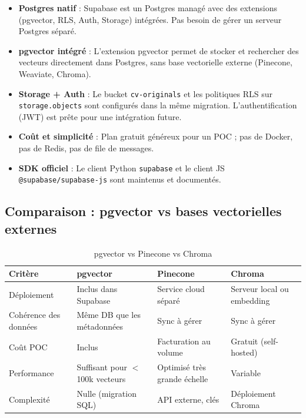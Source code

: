 \documentclass[11pt,a4paper]{report}
\begin{document}
\begin{itemize}[leftmargin=*]
  \item \textbf{Postgres natif} : Supabase est un Postgres managé avec des extensions (pgvector, RLS, Auth, Storage) intégrées. Pas besoin de gérer un serveur Postgres séparé.
  \item \textbf{pgvector intégré} : L'extension pgvector permet de stocker et rechercher des vecteurs directement dans Postgres, sans base vectorielle externe (Pinecone, Weaviate, Chroma).
  \item \textbf{Storage + Auth} : Le bucket \texttt{cv-originals} et les politiques RLS sur \texttt{storage.objects} sont configurés dans la même migration. L'authentification (JWT) est prête pour une intégration future.
  \item \textbf{Coût et simplicité} : Plan gratuit généreux pour un POC ; pas de Docker, pas de Redis, pas de file de messages.
  \item \textbf{SDK officiel} : Le client Python \texttt{supabase} et le client JS \texttt{@supabase/supabase-js} sont maintenus et documentés.
\end{itemize}

\subsection{Comparaison : pgvector vs bases vectorielles externes}

\begin{table}[H]
  \centering
  \caption{pgvector vs Pinecone vs Chroma}
  \small
  \begin{tabular}{@{}lp{2.5cm}p{2.5cm}p{2.5cm}@{}}
    \toprule
    \textbf{Critère} & \textbf{pgvector} & \textbf{Pinecone} & \textbf{Chroma} \\
    \midrule
    Déploiement & Inclus dans Supabase & Service cloud séparé & Serveur local ou embedding \\
    Cohérence des données & Même DB que les métadonnées & Sync à gérer & Sync à gérer \\
    Coût POC & Inclus & Facturation au volume & Gratuit (self-hosted) \\
    Performance & Suffisant pour $<$100k vecteurs & Optimisé très grande échelle & Variable \\
    Complexité & Nulle (migration SQL) & API externe, clés & Déploiement Chroma \\
    \bottomrule
  \end{tabular}
\end{table}
\end{document}
